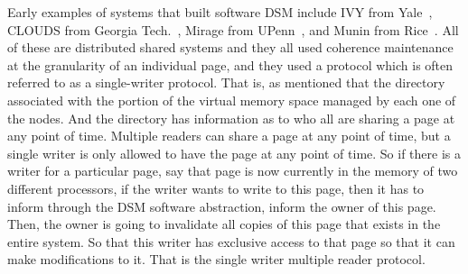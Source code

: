 \documentclass[11pt]{lecture}
\begin{document}
Early examples of 
systems that built software DSM include IVY from Yale~\cite{ivy}, CLOUDS from Georgia Tech.~\cite{clouds}, 
Mirage from UPenn~\cite{mirage}, and Munin from Rice~\cite{munin}. All of these are distributed shared systems and they 
all used coherence maintenance at the granularity of an individual page, and they used a protocol which 
is often referred to as a single-writer protocol. That is, as mentioned that the directory associated with 
the portion of the virtual memory space managed by each one of the nodes. And the directory has information 
as to who all are sharing a page at any point of time. Multiple readers can share a page at any point of time, 
but a single writer is only allowed to have the page at any point of time. So if there is a writer for a particular page, 
say that page is now currently in the memory of two different processors, if the writer wants to write 
to this page, then it has to inform through the DSM software abstraction, inform the owner of this page. Then, 
the owner is going to invalidate all copies of this page that exists in the entire system. So that 
this writer has exclusive access to that page so that it can make modifications to it. That is the single writer 
multiple reader protocol. 
\end{document}
